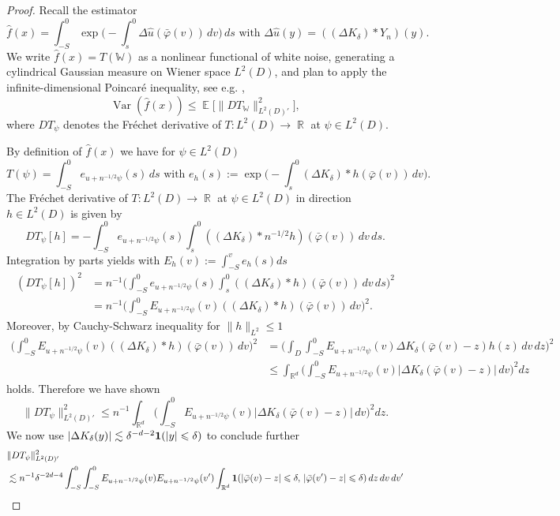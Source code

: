 \documentclass{article}
\numberwithin{equation}{section}
\theoremstyle{definition}
\DeclareMathOperator{\E}{{\mathbb E}}
\DeclareMathOperator{\R}{{\mathbb R}}
\DeclareMathOperator{\Var}{Var} \DeclareMathOperator{\Cov}{Cov}
\renewcommand{\phi}{\varphi}
\providecommand{\abs}[1]{\lvert #1 \rvert}
\providecommand{\norm}[1]{\lVert #1 \rVert}
\renewcommand{\le}{\leqslant}
\begin{document}
\begin{proof} 
Recall the estimator 
\[ \hat f(x)=\int_{-S}^0 \exp\Big(-\int_s^0 \Delta \hat u(\bar \phi(v))\,dv\Big)\,ds\text{ with } \Delta \hat u(y)=((\Delta K_\delta)\ast Y_n)(y).\]
We write $\hat f(x)=T(\mathbb W)$ as a nonlinear functional of white noise, generating a cylindrical Gaussian measure on Wiener space $L^2(D)$, and plan to apply the infinite-dimensional Poincar\'e inequality, see e.g. \cite{nourdin2009second},
\[ \Var(\hat f(x))\le \E\big[\norm{DT_{\mathbb W}}_{L^2(D)'}^2\big],\]
where $DT_\psi$ denotes the Fr\'echet derivative of $T:L^2(D)\to\R$ at $\psi\in L^2(D)$.

By definition of $\hat f(x)$ we have  for $\psi\in L^2(D)$
\[  T(\psi) =\int_{-S}^0 e_{u+n^{-1/2}\psi}(s)\,ds \text{ with }e_h(s):=\exp\Big(-\int_s^0 (\Delta K_\delta)\ast h(\bar \phi(v))\,dv\Big).
\]
The Fr\'echet derivative  of $T:L^2(D)\to\R$ at $\psi\in L^2(D)$ in direction $h\in L^2(D)$ is given by
\[ DT_\psi[h]=-\int_{-S}^0 e_{u+n^{-1/2}\psi}(s)\int_s^0((\Delta K_\delta)\ast n^{-1/2}h)(\bar \phi(v))\,dv\,ds .
\]
Integration by parts yields with $E_h(v):=\int_{-S}^ve_h(s)ds$
\begin{align*} 
(DT_\psi[h])^2 &= n^{-1}\Big(\int_{-S}^0 e_{u+n^{-1/2}\psi}(s)\int_s^0((\Delta K_\delta)\ast h)(\bar\phi(v))\,dv\,ds\Big)^2\\ 
&= n^{-1}\Big(\int_{-S}^0E_{u+n^{-1/2}\psi}(v)((\Delta K_\delta)\ast h)(\bar \phi(v))\,dv\Big)^2.
\end{align*}
Moreover, by  Cauchy-Schwarz inequality for $\norm{h}_{L^2}\le 1$ 
\begin{align*}
\Big(\int_{-S}^0E_{u+n^{-1/2}\psi}(v)((\Delta K_\delta)\ast h)(\bar \phi(v))\,dv\Big)^2 &= \Big(\int_D\int_{-S}^0E_{u+n^{-1/2}\psi}(v)\Delta K_\delta(\bar \phi(v)-z) h(z)\,dv\,dz\Big)^2\\
&\le \int_{\R^d}\Big(\int_{-S}^0E_{u+n^{-1/2}\psi}(v)\abs{\Delta K_\delta(\bar \phi(v)-z)}\,dv\Big)^2 dz
\end{align*}
holds. Therefore we have shown
\[ \norm{DT_\psi}_{L^2(D)'}^2\le n^{-1}\int_{\R^d}\Big(\int_{-S}^0E_{u+n^{-1/2}\psi}(v)\abs{\Delta K_\delta(\bar \phi(v)-z)}\,dv\Big)^2 dz.
\]
We now use $\abs{\Delta K_\delta(y)}\lesssim \delta^{-d-2}{\bf 1}(\abs{y}\le\delta)$ to conclude further
\begin{align*}
&\norm{DT_\psi}_{L^2(D)'}^2\\
&\lesssim n^{-1}\delta^{-2d-4}\int_{-S}^0\int_{-S}^0  E_{u+n^{-1/2}\psi}(v)E_{u+n^{-1/2}\psi}(v')\int_{\R^d}{\bf 1}(\abs{\bar \phi(v)-z}\le\delta,\,\abs{\bar \phi(v')-z}\le\delta)\, dz\,dv\,dv'\\

\end{align*}
\end{proof}
\end{document}

